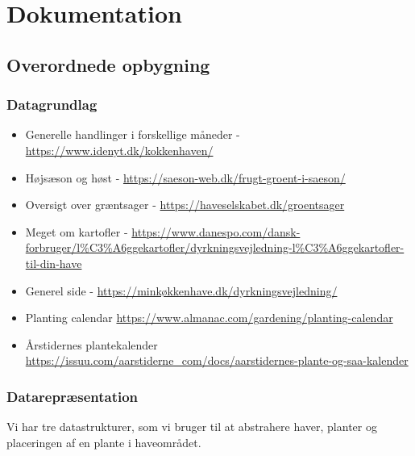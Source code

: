 \newpage
\section{Dokumentation}

\subsection{Overordnede opbygning}

\subsubsection{Datagrundlag}
\begin{itemize}
    \item Generelle handlinger i forskellige måneder - \hyperlink{https://www.idenyt.dk/kokkenhaven/}{https://www.idenyt.dk/kokkenhaven/}
    \item Højsæson og høst - \hyperlink{https://saeson-web.dk/frugt-groent-i-saeson/}{https://saeson-web.dk/frugt-groent-i-saeson/}
    \item Oversigt over græntsager - \hyperlink{https://haveselskabet.dk/groentsager}{https://haveselskabet.dk/groentsager}
    \item Meget om kartofler - \hyperlink{https://www.danespo.com/dansk-forbruger/l\%C3\%A6ggekartofler/dyrkningsvejledning-l\%C3\%A6ggekartofler-til-din-have}{https://www.danespo.com/dansk-forbruger/l\%C3\%A6ggekartofler/dyrkningsvejledning-l\%C3\%A6ggekartofler-til-din-have}
    \item Generel side - \hyperlink{https://minkøkkenhave.dk/dyrkningsvejledning/}{https://minkøkkenhave.dk/dyrkningsvejledning/}
    \item Planting calendar \hyperlink{https://www.almanac.com/gardening/planting-calendar}{https://www.almanac.com/gardening/planting-calendar}
    \item Årstidernes plantekalender \hyperlink{https://issuu.com/aarstiderne\_com/docs/aarstidernes-plante-og-saa-kalender}{https://issuu.com/aarstiderne\_com/docs/aarstidernes-plante-og-saa-kalender}
\end{itemize}

\subsubsection{Datarepræsentation}

Vi har tre datastrukturer, som vi bruger til at abstrahere haver, planter og placeringen af en plante i haveområdet.

